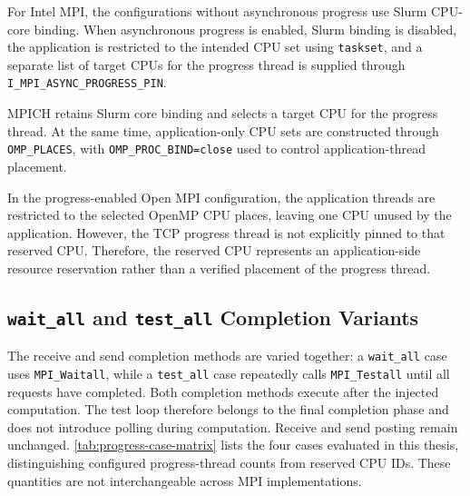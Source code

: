 For Intel MPI, the configurations without asynchronous progress use Slurm CPU-core binding. When asynchronous progress is enabled, Slurm binding is disabled, the application is restricted to the intended CPU set using \texttt{taskset}, and a separate list of target CPUs for the progress thread is supplied through \texttt{I\_MPI\_}\allowbreak\texttt{ASYNC\_}\allowbreak\texttt{PROGRESS\_PIN}.

MPICH retains Slurm core binding and selects a target CPU for the progress thread. At the same time, application-only CPU sets are constructed through \texttt{OMP\_PLACES}, with \texttt{OMP\_PROC\_}\allowbreak\texttt{BIND=close} used to control application-thread placement.

In the progress-enabled Open MPI configuration, the application threads are restricted to the selected OpenMP CPU places, leaving one CPU unused by the application. However, the TCP progress thread is not explicitly pinned to that reserved CPU. Therefore, the reserved CPU represents an application-side resource reservation rather than a verified placement of the progress thread.





\subsection{\texttt{wait\_all} and \texttt{test\_all} Completion Variants}

The receive and send completion methods are varied together: a
\texttt{wait\_all} case uses \texttt{MPI\_Waitall}, while a
\texttt{test\_all} case repeatedly calls \texttt{MPI\_Testall} until all
requests have completed. Both completion methods execute after the injected
computation. The test loop therefore belongs to the final completion phase
and does not introduce polling during computation. Receive and send posting
remain unchanged. \autoref{tab:progress-case-matrix} lists the four cases
evaluated in this thesis, distinguishing configured progress-thread counts
from reserved CPU IDs. These quantities are not interchangeable across MPI
implementations.

